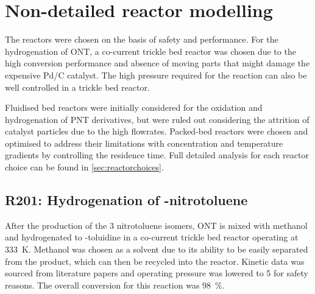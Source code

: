 \section{Non-detailed reactor modelling} \label{Non-detailed}

The reactors were chosen on the basis of safety and performance. For the hydrogenation of ONT, a co-current trickle bed reactor was chosen due to the high conversion performance and absence of moving parts that might damage the expensive Pd/C catalyst. The high pressure required for the reaction can also be well controlled in a trickle bed reactor. 

Fluidised bed reactors were initially considered for the oxidation and hydrogenation of PNT derivatives, but were ruled out considering the attrition of catalyst particles due to the high flowrates. Packed-bed reactors were chosen and optimised to address their limitations with concentration and temperature gradients by controlling the residence time. Full detailed analysis for each reactor choice can be found in \cref{sec:reactorchoices}.

\begin{table}[h]
\centering
\caption{Summary of non-detailed reactors}
\label{tab:nondetailedtable}
\end{table}

\subsection{R201: Hydrogenation of \ortho-nitrotoluene}
After the production of the 3 nitrotoluene isomers, ONT is mixed with methanol and hydrogenated to \ortho-toluidine in a co-current trickle bed reactor operating at \SI{333}{\K}. Methanol was chosen as a solvent due to its ability to be easily separated from the product, which can then be recycled into the reactor. Kinetic data was sourced from literature papers \cite{rajadhyaksha_solvent_1986} and operating pressure was lowered to \SI{5}{\atm} for safety reasons. The overall conversion for this reaction was \SI{98}{\%}.

